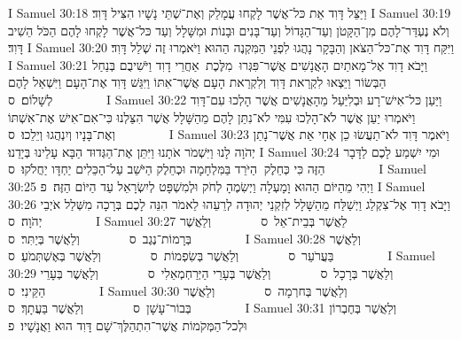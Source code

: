 I Samuel 30:18	וַיַּצֵּל דָּוִד אֵת כּל־אֲשֶׁר לָקְחוּ עֲמָלֵק וְאֶת־שְׁתֵּי נָשָׁיו הִצִּיל דָּוִד׃
I Samuel 30:19	וְלֹא נֶעְדַּר־לָהֶם מִן־הַקָּטֹן וְעַד־הַגָּדוֹל וְעַד־בָּנִים וּבָנוֹת וּמִשָּׁלָל וְעַד כּל־אֲשֶׁר לָקְחוּ לָהֶם הַכֹּל הֵשִׁיב דָּוִד׃
I Samuel 30:20	וַיִּקַּח דָּוִד אֶת־כּל־הַצֹּאן וְהַבָּקָר נָהֲגוּ לִפְנֵי הַמִּקְנֶה הַהוּא וַיֹּאמְרוּ זֶה שְׁלַל דָּוִד׃
I Samuel 30:21	וַיָּבֹא דָוִד אֶל־מָאתַיִם הָאֲנָשִׁים אֲשֶׁר־פִּגְּרוּ  מִלֶּכֶת  אַחֲרֵי דָוִד וַיֹּשִׁיבֻם בְּנַחַל הַבְּשׂוֹר וַיֵּצְאוּ לִקְרַאת דָּוִד וְלִקְרַאת הָעָם אֲשֶׁר־אִתּוֹ וַיִּגַּשׁ דָּוִד אֶת־הָעָם וַיִּשְׁאַל לָהֶם לְשָׁלוֹם׃ {ס}        
I Samuel 30:22	וַיַּעַן כּל־אִישׁ־רָע וּבְלִיַּעַל מֵהָאֲנָשִׁים אֲשֶׁר הָלְכוּ עִם־דָּוִד וַיֹּאמְרוּ יַעַן אֲשֶׁר לֹא־הָלְכוּ עִמִּי לֹא־נִתֵּן לָהֶם מֵהַשָּׁלָל אֲשֶׁר הִצַּלְנוּ כִּי־אִם־אִישׁ אֶת־אִשְׁתּוֹ וְאֶת־בָּנָיו וְיִנְהֲגוּ וְיֵלֵכוּ׃ {ס}        
I Samuel 30:23	וַיֹּאמֶר דָּוִד לֹא־תַעֲשׂוּ כֵן אֶחָי אֵת אֲשֶׁר־נָתַן יְהֹוָה לָנוּ וַיִּשְׁמֹר אֹתָנוּ וַיִּתֵּן אֶת־הַגְּדוּד הַבָּא עָלֵינוּ בְּיָדֵנוּ׃
I Samuel 30:24	וּמִי יִשְׁמַע לָכֶם לַדָּבָר הַזֶּה כִּי כְּחֵלֶק  הַיֹּרֵד בַּמִּלְחָמָה וּכְחֵלֶק הַיֹּשֵׁב עַל־הַכֵּלִים יַחְדָּו יַחֲלֹקוּ׃ {ס}        
I Samuel 30:25	וַיְהִי מֵהַיּוֹם הַהוּא וָמָעְלָה וַיְשִׂמֶהָ לְחֹק וּלְמִשְׁפָּט לְיִשְׂרָאֵל עַד הַיּוֹם הַזֶּה׃ {פ}
I Samuel 30:26	וַיָּבֹא דָוִד אֶל־צִקְלַג וַיְשַׁלַּח מֵהַשָּׁלָל לְזִקְנֵי יְהוּדָה לְרֵעֵהוּ לֵאמֹר הִנֵּה לָכֶם בְּרָכָה מִשְּׁלַל אֹיְבֵי יְהֹוָה׃ {ס}        
I Samuel 30:27	לַאֲשֶׁר בְּבֵית־אֵל {ס}        וְלַאֲשֶׁר בְּרָמוֹת־נֶגֶב {ס}        וְלַאֲשֶׁר בְּיַתִּר׃ {ס}        
I Samuel 30:28	וְלַאֲשֶׁר בַּעֲרֹעֵר {ס}        וְלַאֲשֶׁר בְּשִׂפְמוֹת {ס}        וְלַאֲשֶׁר בְּאֶשְׁתְּמֹעַ׃ {ס}        
I Samuel 30:29	וְלַאֲשֶׁר בְּרָכָל {ס}        וְלַאֲשֶׁר בְּעָרֵי הַיְּרַחְמְאֵלִי {ס}        וְלַאֲשֶׁר בְּעָרֵי הַקֵּינִי׃ {ס}        
I Samuel 30:30	וְלַאֲשֶׁר בְּחרְמָה {ס}        וְלַאֲשֶׁר בְּבוֹר־עָשָׁן {ס}        וְלַאֲשֶׁר בַּעֲתָךְ׃ {ס}        
I Samuel 30:31	וְלַאֲשֶׁר בְּחֶבְרוֹן וּלְכל־הַמְּקֹמוֹת אֲשֶׁר־הִתְהַלֶּךְ־שָׁם דָּוִד הוּא וַאֲנָשָׁיו׃ {פ}
